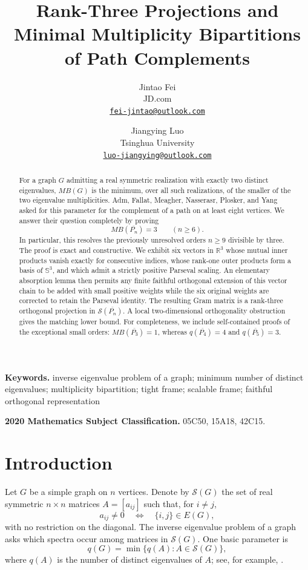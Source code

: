 \documentclass[11pt]{article}
\title{Rank-Three Projections and Minimal Multiplicity Bipartitions of Path Complements}
\author{Jintao Fei\\
\small JD.com\\
\small \href{mailto:fei-jintao@outlook.com}{\texttt{fei-jintao@outlook.com}}
\and
Jiangying Luo\\
\small Tsinghua University\\
\small \href{mailto:luo-jiangying@outlook.com}{\texttt{luo-jiangying@outlook.com}}}
\date{}
\theoremstyle{remark}
\newcommand{\R}{\mathbb{R}}
\newcommand{\Sn}{\mathbb{S}}
\newcommand{\cS}{\mathcal{S}}
\begin{document}
\maketitle

\begin{abstract}
For a graph $G$ admitting a real symmetric realization with exactly two
distinct eigenvalues, $MB(G)$ is the minimum, over all such realizations,
of the smaller of the two eigenvalue multiplicities.  Adm,
Fallat, Meagher, Nasserasr, Plosker, and Yang asked for this parameter for
the complement of a path on at least eight vertices.  We answer their
question completely by proving
\[
        MB(\overline{P_n})=3 \qquad (n\ge 6).
\]
In particular, this resolves the previously unresolved orders $n\ge9$
divisible by three.  The proof is exact and constructive.  We exhibit six
vectors in $\R^3$ whose mutual inner products vanish exactly for consecutive
indices, whose rank-one outer products form a basis of $\Sn^3$, and which
admit a strictly positive Parseval scaling.
An elementary absorption lemma then permits any finite faithful orthogonal
extension of this vector chain to be added with small positive weights while
the six original weights are corrected to retain the Parseval identity.
The resulting Gram matrix is a rank-three orthogonal projection in
$\cS(\overline{P_n})$.  A local two-dimensional orthogonality obstruction
gives the matching lower bound.  For completeness, we include self-contained
proofs of the exceptional small orders: $MB(\overline{P_3})=1$, whereas
$q(\overline{P_4})=4$ and $q(\overline{P_5})=3$.
\end{abstract}

\medskip
\noindent\textbf{Keywords.}
inverse eigenvalue problem of a graph; minimum number of distinct
eigenvalues; multiplicity bipartition; tight frame; scalable frame;
faithful orthogonal representation

\medskip
\noindent\textbf{2020 Mathematics Subject Classification.}
05C50, 15A18, 42C15.

\section{Introduction}

Let $G$ be a simple graph on $n$ vertices.  Denote by $\cS(G)$ the set of
real symmetric $n\times n$ matrices $A=[a_{ij}]$ such that, for $i\ne j$,
\[
 a_{ij}\ne0 \quad\Longleftrightarrow\quad \{i,j\}\in E(G),
\]
with no restriction on the diagonal.  The inverse eigenvalue problem of a
graph asks which spectra occur among matrices in $\cS(G)$.  One basic
parameter is
\[
 q(G)=\min\{q(A):A\in\cS(G)\},
\]
where $q(A)$ is the number of distinct eigenvalues of $A$; see, for example,
\cite{AhmadiEtAl2013,AdmEtAl2019,HogbenLinShader2022}.
\end{document}
